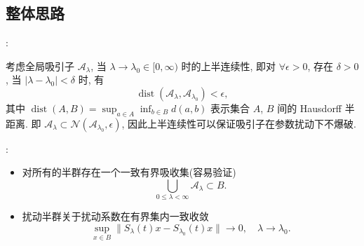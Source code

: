 \documentclass[UTF8]{ctexbeamer}
\newcommand*\abs[1]{\lvert#1\rvert}
\newcommand*\norm[1]{\lVert#1\rVert}
\DeclareMathOperator{\dist}{dist}
\begin{document}
\subsection{整体思路}
\begin{frame}{\secname : \subsecname}

    考虑全局吸引子 $\mathcal{A}_\lambda$, 当 $\lambda \to \lambda_0 \in [0, \infty)$ 时的上半连续性, 即对
    $\forall \epsilon > 0$, 存在 $\delta > 0$, 当 $\abs{\lambda - \lambda_0} < \delta$ 时, 有
    \begin{equation*}
        \dist(\mathcal{A}_\lambda, \mathcal{A}_{\lambda_0}) < \epsilon,
    \end{equation*}
    其中 $\dist(A, B) = \sup_{a \in A}\inf_{b \in B}d(a, b)$ 表示集合 $A$, $B$ 间的 Hausdorff 半距离.
    即 $\mathcal{A}_\lambda \subset \mathcal{N}(\mathcal{A}_{\lambda_0}, \epsilon)$, 因此上半连续性可以保证吸引子在参数扰动下不爆破.

\end{frame}
\begin{frame}{\secname : \subsecname}

    \begin{itemize}
        \item 对所有的半群存在一个一致有界吸收集(容易验证)
        \begin{equation*}
            \bigcup_{0 \leq \lambda < \infty} \mathcal{A}_\lambda \subset B.
        \end{equation*}
        \item 扰动半群关于扰动系数在有界集内一致收敛
        \begin{equation*}
            \sup_{x \in B}\norm{S_\lambda(t)x - S_{\lambda_0}(t)x} \to 0, \quad \lambda \to \lambda_0.
        \end{equation*}
    \end{itemize}

\end{frame}
\end{document}
